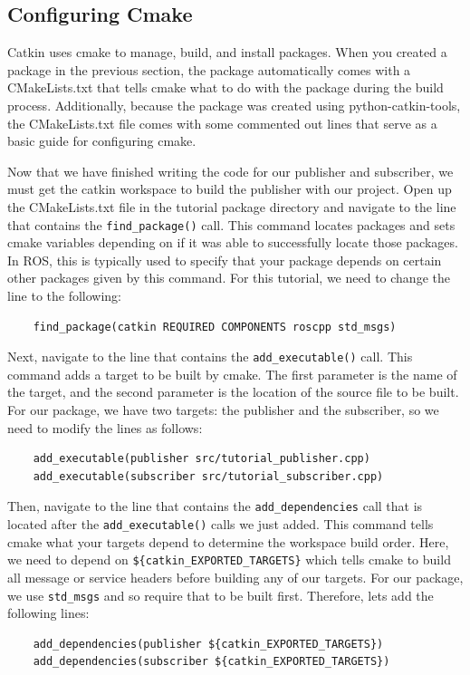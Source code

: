 \documentclass[11pt, twoside, pdftex]{article}
\begin{document}
\subsection{Configuring Cmake}
Catkin uses cmake to manage, build, and install packages. When you created a package in the previous section, the package automatically comes with a CMakeLists.txt that tells cmake what to do with the package during the build process. Additionally, because the package was created using python-catkin-tools, the CMakeLists.txt file comes with some commented out lines that serve as a basic guide for configuring cmake.

Now that we have finished writing the code for our publisher and subscriber, we must get the catkin workspace to build the publisher with our project. Open up the CMakeLists.txt file in the tutorial package directory and navigate to the line that contains the \lstinline|find_package()| call. This command locates packages and sets cmake variables depending on if it was able to successfully locate those packages. In ROS, this is typically used to specify that your package depends on certain other packages given by this command. For this tutorial, we need to change the line to the following:
\begin{lstlisting}
	find_package(catkin REQUIRED COMPONENTS roscpp std_msgs)
\end{lstlisting}

Next, navigate to the line that contains the \lstinline|add_executable()| call. This command adds a target to be built by cmake. The first parameter is the name of the target, and the second parameter is the location of the source file to be built. For our package, we have two targets: the publisher and the subscriber, so we need to modify the lines as follows:
\begin{lstlisting}
	add_executable(publisher src/tutorial_publisher.cpp)
	add_executable(subscriber src/tutorial_subscriber.cpp)
\end{lstlisting}

Then, navigate to the line that contains the \lstinline|add_dependencies| call that is located after the \lstinline|add_executable()| calls we just added. This command tells cmake what your targets depend to determine the workspace build order. Here, we need to depend on \lstinline|${catkin_EXPORTED_TARGETS}| which tells cmake to build all message or service headers before building any of our targets. For our package, we use \lstinline|std_msgs| and so require that to be built first. Therefore, lets add the following lines:
\begin{lstlisting}
	add_dependencies(publisher ${catkin_EXPORTED_TARGETS})
	add_dependencies(subscriber ${catkin_EXPORTED_TARGETS})
\end{lstlisting}
\end{document}
